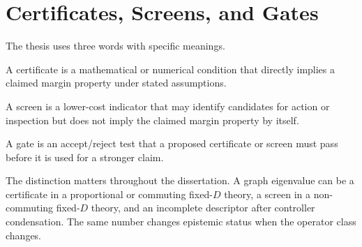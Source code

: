 \section{Certificates, Screens, and Gates}

The thesis uses three words with specific meanings.

\begin{definition}[Certificate]
A certificate is a mathematical or numerical condition that directly implies a
claimed margin property under stated assumptions.
\end{definition}

\begin{definition}[Screen]
A screen is a lower-cost indicator that may identify candidates for action or
inspection but does not imply the claimed margin property by itself.
\end{definition}

\begin{definition}[Gate]
A gate is an accept/reject test that a proposed certificate or screen must pass
before it is used for a stronger claim.
\end{definition}

The distinction matters throughout the dissertation. A graph eigenvalue can be
a certificate in a proportional or commuting fixed-\(D\) theory, a screen in a
non-commuting fixed-\(D\) theory, and an incomplete descriptor after controller
condensation. The same number changes epistemic status when the operator class
changes.
